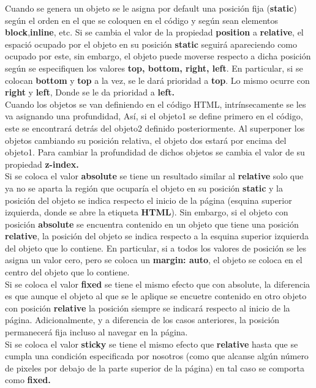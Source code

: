 \documentclass[10pt,oneside]{article}
\begin{document}
\begin{multicols}{2}
    Cuando se genera un objeto se le asigna por default una posición fija (\textbf{static}) según el orden en el que se coloquen en el código y según sean elementos \textbf{block},\textbf{inline}, etc. Si se cambia el valor de la propiedad \textbf{position} a \textbf{relative}, el espació ocupado por el objeto en su posición \textbf{static} seguirá apareciendo como ocupado por este, sin embargo, el objeto puede moverse respecto a dicha posición según se especifiquen los valores \textbf{top, bottom, right, left}. En particular, si se colocan \textbf{bottom} y \textbf{top} a la vez, se le dará prioridad a \textbf{top}. Lo mismo ocurre con \textbf{right} y \textbf{left}, Donde se le da prioridad a \textbf{left.} \\ \newline Cuando los objetos se van definiendo en el código HTML, intrínsecamente se les va asignando una profundidad, Así, si el objeto1 se define primero en el código, este se encontrará detrás del objeto2 definido posteriormente. Al superponer los objetos cambiando su posición relativa, el objeto dos estará por encima del objeto1. Para cambiar la profundidad de dichos objetos se cambia el valor de su propiedad \textbf{z-index.} \\ \newline Si se coloca el valor \textbf{absolute} se tiene un resultado similar al \textbf{relative} solo que ya no se aparta la región que ocuparía el objeto en su posición \textbf{static} y la posición del objeto se indica respecto el inicio de la página (esquina superior izquierda, donde se abre la etiqueta \textbf{HTML}). Sin embargo, si el objeto con posición \textbf{absolute} se encuentra contenido en un objeto que tiene una posición \textbf{relative}, la posición del objeto se indica respecto a la esquina superior izquierda del objeto que lo contiene. En particular, si a todos los valores de posición se les asigna un valor cero, pero se coloca un \textbf{margin: auto}, el objeto se coloca en el centro del objeto que lo contiene. \\\newline Si se coloca el valor \textbf{fixed} se tiene el mismo efecto que con absolute, la diferencia es que aunque el objeto al que se le aplique se encuetre contenido en otro objeto con posición \textbf{relative} la posición siempre se indicará respecto al inicio de la página. Adicionalmente, y a diferencia de los casos anteriores, la posición permanecerá fija incluso al navegar en la página. \\ \newline Si se coloca  el valor \textbf{sticky} se tiene el mismo efecto que \textbf{relative} hasta que se cumpla una condición especificada por nosotros (como que alcanse algún número de pixeles por debajo de la parte superior de la página) en tal caso se comporta como \textbf{fixed.} 


\end{multicols}
\end{document}
